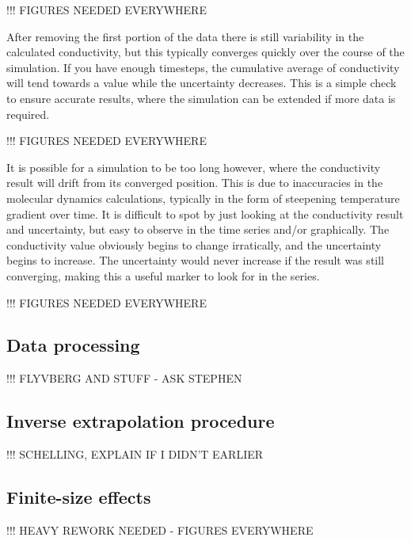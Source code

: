 !!! FIGURES NEEDED EVERYWHERE

After removing the first portion of the data there is still variability in the calculated conductivity, but this typically converges quickly over the course of the simulation. If you have enough timesteps, the cumulative average of conductivity will tend towards a value while the uncertainty decreases. This is a simple check to ensure accurate results, where the simulation can be extended if more data is required.

!!! FIGURES NEEDED EVERYWHERE

It is possible for a simulation to be too long however, where the conductivity result will drift from its converged position. This is due to inaccuracies in the molecular dynamics calculations, typically in the form of steepening temperature gradient over time. It is difficult to spot by just looking at the conductivity result and uncertainty, but easy to observe in the time series and/or graphically. The conductivity value obviously begins to change irratically, and the uncertainty begins to increase. The uncertainty would never increase if the result was still converging, making this a useful marker to look for in the series.

!!! FIGURES NEEDED EVERYWHERE


\subsection{\label{sec:3.DM.data}Data processing}

!!! FLYVBERG AND STUFF - ASK STEPHEN


\subsection{\label{sec:3.DM.extrap}Inverse extrapolation procedure}

!!! SCHELLING, EXPLAIN IF I DIDN'T EARLIER


\subsection{\label{sec:3.DM.fse}Finite-size effects}

!!! HEAVY REWORK NEEDED - FIGURES EVERYWHERE

